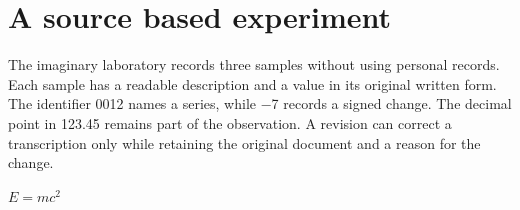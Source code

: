 \documentclass{article}
\begin{document}
\section{A source based experiment}\label{opening}

The imaginary laboratory records three samples without using personal records. Each sample has a readable description and a value in its original written form. The identifier 0012 names a series, while −7 records a signed change. The decimal point in 123.45 remains part of the observation. A revision can correct a transcription only while retaining the original document and a reason for the change.

$E=mc^{2}$



\end{document}
